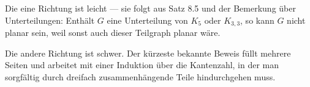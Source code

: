 \begin{warnung}
Die eine Richtung ist leicht --- sie folgt aus Satz 8.5 und der Bemerkung über Unterteilungen: Enthält $G$ eine Unterteilung von $K_5$ oder $K_{3,3}$, so kann $G$ nicht planar sein, weil sonst auch dieser Teilgraph planar wäre.

Die andere Richtung ist schwer. Der kürzeste bekannte Beweis füllt mehrere Seiten und arbeitet mit einer Induktion über die Kantenzahl, in der man sorgfältig durch dreifach zusammenhängende Teile hindurchgehen muss.

\begin{center}
\begin{minipage}{0.88\textwidth}
\end{minipage}
\end{center}
\end{warnung}

